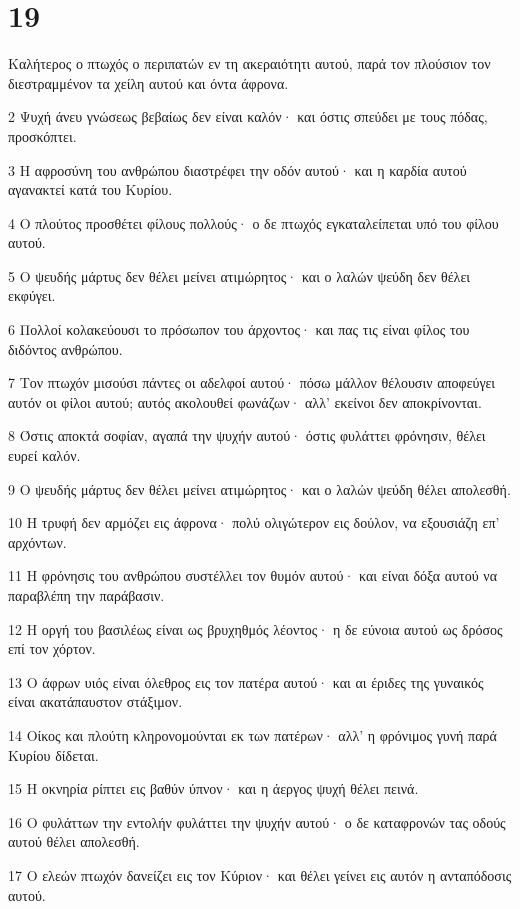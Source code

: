 \chapter{19}

\par Καλήτερος ο πτωχός ο περιπατών εν τη ακεραιότητι αυτού, παρά τον πλούσιον τον διεστραμμένον τα χείλη αυτού και όντα άφρονα.
\par 2 Ψυχή άνευ γνώσεως βεβαίως δεν είναι καλόν· και όστις σπεύδει με τους πόδας, προσκόπτει.
\par 3 Η αφροσύνη του ανθρώπου διαστρέφει την οδόν αυτού· και η καρδία αυτού αγανακτεί κατά του Κυρίου.
\par 4 Ο πλούτος προσθέτει φίλους πολλούς· ο δε πτωχός εγκαταλείπεται υπό του φίλου αυτού.
\par 5 Ο ψευδής μάρτυς δεν θέλει μείνει ατιμώρητος· και ο λαλών ψεύδη δεν θέλει εκφύγει.
\par 6 Πολλοί κολακεύουσι το πρόσωπον του άρχοντος· και πας τις είναι φίλος του διδόντος ανθρώπου.
\par 7 Τον πτωχόν μισούσι πάντες οι αδελφοί αυτού· πόσω μάλλον θέλουσιν αποφεύγει αυτόν οι φίλοι αυτού; αυτός ακολουθεί φωνάζων· αλλ' εκείνοι δεν αποκρίνονται.
\par 8 Όστις αποκτά σοφίαν, αγαπά την ψυχήν αυτού· όστις φυλάττει φρόνησιν, θέλει ευρεί καλόν.
\par 9 Ο ψευδής μάρτυς δεν θέλει μείνει ατιμώρητος· και ο λαλών ψεύδη θέλει απολεσθή.
\par 10 Η τρυφή δεν αρμόζει εις άφρονα· πολύ ολιγώτερον εις δούλον, να εξουσιάζη επ' αρχόντων.
\par 11 Η φρόνησις του ανθρώπου συστέλλει τον θυμόν αυτού· και είναι δόξα αυτού να παραβλέπη την παράβασιν.
\par 12 Η οργή του βασιλέως είναι ως βρυχηθμός λέοντος· η δε εύνοια αυτού ως δρόσος επί τον χόρτον.
\par 13 Ο άφρων υιός είναι όλεθρος εις τον πατέρα αυτού· και αι έριδες της γυναικός είναι ακατάπαυστον στάξιμον.
\par 14 Οίκος και πλούτη κληρονομούνται εκ των πατέρων· αλλ' η φρόνιμος γυνή παρά Κυρίου δίδεται.
\par 15 Η οκνηρία ρίπτει εις βαθύν ύπνον· και η άεργος ψυχή θέλει πεινά.
\par 16 Ο φυλάττων την εντολήν φυλάττει την ψυχήν αυτού· ο δε καταφρονών τας οδούς αυτού θέλει απολεσθή.
\par 17 Ο ελεών πτωχόν δανείζει εις τον Κύριον· και θέλει γείνει εις αυτόν η ανταπόδοσις αυτού.
